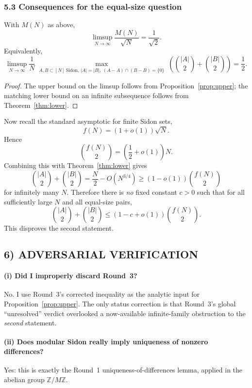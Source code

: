 \subsubsection{5.3 Consequences for the equal-size question}

\begin{corollary}\label{cor:limsup}
With $M(N)$ as above,
\[
\limsup_{N\to\infty}\frac{M(N)}{\sqrt N}=\frac1{\sqrt2}.
\]
Equivalently,
\[
\limsup_{N\to\infty}\frac{1}{N}
\max_{\substack{A,B\subset[N]\ \text{Sidon},\ |A|=|B|,\ (A-A)\cap(B-B)=\{0\}}}
\left(\binom{|A|}{2}+\binom{|B|}{2}\right)=\frac12.
\]
\end{corollary}

\begin{proof}
The upper bound on the limsup follows from Proposition~\ref{prop:upper}; the matching lower bound on an infinite subsequence follows from Theorem~\ref{thm:lower}.
\end{proof}

Now recall the standard asymptotic for finite Sidon sets,
\[
f(N)=(1+o(1))\sqrt N.
\]
Hence
\[
\binom{f(N)}{2}=\left(\frac12+o(1)\right)N.
\]
Combining this with Theorem~\ref{thm:lower} gives
\[
\binom{|A|}{2}+\binom{|B|}{2}
=\frac N2-O(N^{3/4})
\ge (1-o(1))\binom{f(N)}{2}
\]
for infinitely many $N$.
Therefore there is \emph{no} fixed constant $c>0$ such that for all sufficiently large $N$ and all equal-size pairs,
\[
\binom{|A|}{2}+\binom{|B|}{2}\le (1-c+o(1))\binom{f(N)}{2}.
\]
This disproves the second statement.

\subsection{6) ADVERSARIAL VERIFICATION}

\paragraph{(i) Did I improperly discard Round~3?}
No.  I use Round~3's corrected inequality as the analytic input for Proposition~\ref{prop:upper}.  The only status correction is that Round~3's global ``unresolved'' verdict overlooked a now-available infinite-family obstruction to the \emph{second} statement.

\paragraph{(ii) Does modular Sidon really imply uniqueness of nonzero differences?}
Yes: this is exactly the Round~1 uniqueness-of-differences lemma, applied in the abelian group $\mathbb Z/M\mathbb Z$.

